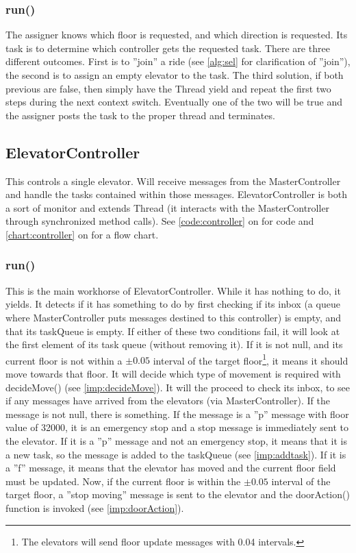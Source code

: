 \subsubsection{run()}
The assigner knows which floor is requested, and which direction is requested.\newline
Its task is to determine which controller gets the requested task. There are three different outcomes. First is to ''join'' a ride (see \cref{alg:sel} for clarification of ''join''), the second is to assign an empty elevator to the task. The third solution, if both previous are false, then simply have the Thread yield and repeat the first two steps during the next context switch. Eventually one of the two will be true and the assigner posts the task to the proper thread and terminates.

\subsection{ElevatorController}
This controls a single elevator. Will receive messages from the MasterController and handle the tasks contained within those messages. ElevatorController is both a sort of monitor and extends Thread (it interacts with the MasterController through synchronized method calls). See \cref{code:controller} on  for code and \cref{chart:controller} on  for a flow chart.

\subsubsection{run()}
\label{imp:elerun}
This is the main workhorse of ElevatorController. While it has nothing to do, it yields. It detects if it has something to do by first checking if its inbox (a queue where MasterController puts messages destined to this controller) is empty, and that its taskQueue is empty.\newline
If either of these two conditions fail, it will look at the first element of its task queue (without removing it). If it is not null, and its current floor is not within a $\pm 0.05$ interval of the target floor\footnote{The elevators will send floor update messages with 0.04 intervals.}, it means it should move towards that floor. It will decide which type of movement is required with decideMove() (see \cref{imp:decideMove}). \newline
It will the proceed to check its inbox, to see if any messages have arrived from the elevators (via MasterController). If the message is not null, there is something. If the message is a ''p'' message with floor value of 32000, it is an emergency stop and a stop message is immediately sent to the elevator.\newline
If it is a ''p'' message and not an emergency stop, it means that it is a new task, so the message is added to the taskQueue (see \cref{imp:addtask}).\newline
If it is a ''f'' message, it means that the elevator has moved and the current floor field must be updated. Now, if the current floor is within the $\pm0.05$ interval of the target floor, a ''stop moving'' message is sent to the elevator and the doorAction() function is invoked (see \cref{imp:doorAction}).

